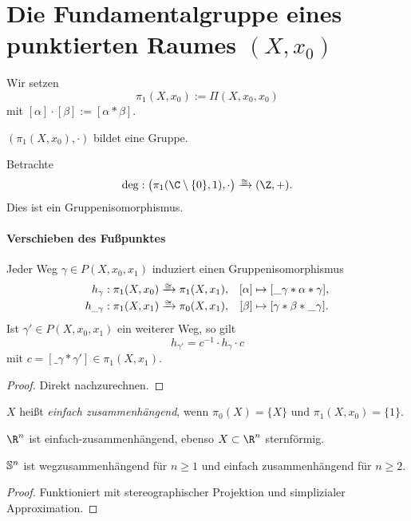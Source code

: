 

\section{Die Fundamentalgruppe eines punktierten Raumes \texorpdfstring{$(X,x_0)$}{(X,x₀)}}


\begin{df}
	Wir setzen
	\[
		\pi_1(X, x_0)
		:= \Pi(X, x_0, x_0)
	\]
	mit $[\alpha] \cdot [\beta] := [\alpha * \beta]$.

	$(\pi_1(X, x_0), \cdot)$ bildet eine Gruppe.
\end{df}

\begin{ex}
	Betrachte
	\[
		\deg: \big(\pi_1(\C \setminus \{0\}, 1), \cdot\big) \homeomorphicto (\Z, +).
	\]
	Dies ist ein Gruppenisomorphismus.
\end{ex}

\paragraph{Verschieben des Fußpunktes}

\begin{prop}
	Jeder Weg $\gamma \in P(X, x_0, x_1)$ induziert einen Gruppenisomorphismus
	\begin{align*}
		h_\gamma: \pi_1(X,x_0) &\isomorphicto \pi_1(X, x_1),& [\alpha] &\mapsto [\_\gamma * \alpha * \gamma], \\
		h_{\_\gamma}: \pi_1(X,x_1) &\isomorphicto \pi_0(X, x_1),& [\beta] &\mapsto [\gamma * \beta * \_\gamma].
	\end{align*}
	Ist $\gamma' \in P(X, x_0, x_1)$ ein weiterer Weg, so gilt
	\[
		h_{\gamma'} = c^{-1} \cdot h_\gamma \cdot c
	\]
	mit $c = [\_\gamma * \gamma'] \in \pi_1(X, x_1)$.
	\begin{proof}
		Direkt nachzurechnen.
	\end{proof}
\end{prop}

\begin{df}
	$X$ heißt \emph{einfach zusammenhängend}, wenn $\pi_0(X) = \{X\}$ und $\pi_1(X, x_0) = \{1\}$.
\end{df}

\begin{ex}
	$\R^n$ ist einfach-zusammenhängend, ebenso $X \subset \R^n$ sternförmig.
\end{ex}

\begin{ex}
	$\S^n$ ist wegzusammenhängend für $n \ge 1$ und einfach zusammenhängend für $n \ge 2$.
	\begin{proof}
		Funktioniert mit stereographischer Projektion und simplizialer Approximation.
	\end{proof}
\end{ex}

